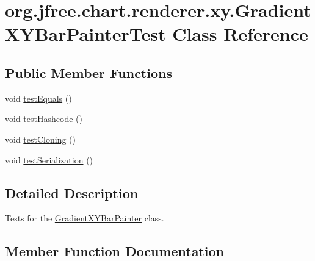 \hypertarget{classorg_1_1jfree_1_1chart_1_1renderer_1_1xy_1_1_gradient_x_y_bar_painter_test}{}\section{org.\+jfree.\+chart.\+renderer.\+xy.\+Gradient\+X\+Y\+Bar\+Painter\+Test Class Reference}
\label{classorg_1_1jfree_1_1chart_1_1renderer_1_1xy_1_1_gradient_x_y_bar_painter_test}
\subsection*{Public Member Functions}
\begin{DoxyCompactItemize}
\item 
void \mbox{\hyperlink{classorg_1_1jfree_1_1chart_1_1renderer_1_1xy_1_1_gradient_x_y_bar_painter_test_ad982432679ba911cc2bec34ef6aa2d61}{test\+Equals}} ()
\item 
void \mbox{\hyperlink{classorg_1_1jfree_1_1chart_1_1renderer_1_1xy_1_1_gradient_x_y_bar_painter_test_acb8aaf945974af1fd9ae1b4639900b97}{test\+Hashcode}} ()
\item 
void \mbox{\hyperlink{classorg_1_1jfree_1_1chart_1_1renderer_1_1xy_1_1_gradient_x_y_bar_painter_test_a2c66c6de00ba6fdb2c067b87bd87cce9}{test\+Cloning}} ()
\item 
void \mbox{\hyperlink{classorg_1_1jfree_1_1chart_1_1renderer_1_1xy_1_1_gradient_x_y_bar_painter_test_a4a97419689ebae501e58d6b9ad001b61}{test\+Serialization}} ()
\end{DoxyCompactItemize}


\subsection{Detailed Description}
Tests for the \mbox{\hyperlink{classorg_1_1jfree_1_1chart_1_1renderer_1_1xy_1_1_gradient_x_y_bar_painter}{Gradient\+X\+Y\+Bar\+Painter}} class. 

\subsection{Member Function Documentation}
\mbox{\label{classorg_1_1jfree_1_1chart_1_1renderer_1_1xy_1_1_gradient_x_y_bar_painter_test_a2c66c6de00ba6fdb2c067b87bd87cce9}} 
